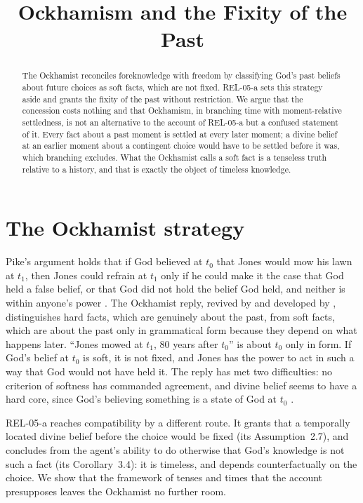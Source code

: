 \documentclass{situationist-preprint}
\title{Ockhamism and the Fixity of the Past}
\begin{document}
\maketitle

\begin{abstract}
The Ockhamist reconciles foreknowledge with freedom by classifying God's past beliefs about future choices as soft facts, which are not fixed. REL-05-a sets this strategy aside and grants the fixity of the past without restriction. We argue that the concession costs nothing and that Ockhamism, in branching time with moment-relative settledness, is not an alternative to the account of REL-05-a but a confused statement of it. Every fact about a past moment is settled at every later moment; a divine belief at an earlier moment about a contingent choice would have to be settled before it was, which branching excludes. What the Ockhamist calls a soft fact is a tenseless truth relative to a history, and that is exactly the object of timeless knowledge.
\end{abstract}

\section{The Ockhamist strategy}

Pike's argument holds that if God believed at $t_0$ that Jones would mow his lawn at $t_1$, then Jones could refrain at $t_1$ only if he could make it the case that God held a false belief, or that God did not hold the belief God held, and neither is within anyone's power \citep{Pike1965}. The Ockhamist reply, revived by \citet{Adams1967} and developed by \citet{Plantinga1986}, distinguishes hard facts, which are genuinely about the past, from soft facts, which are about the past only in grammatical form because they depend on what happens later. \enquote{Jones mowed at $t_1$, 80 years after $t_0$} is about $t_0$ only in form. If God's belief at $t_0$ is soft, it is not fixed, and Jones has the power to act in such a way that God would not have held it. The reply has met two difficulties: no criterion of softness has commanded agreement, and divine belief seems to have a hard core, since God's believing something is a state of God at $t_0$ \citep{Zagzebski1991}.

REL-05-a reaches compatibility by a different route. It grants that a temporally located divine belief before the choice would be fixed (its Assumption~2.7), and concludes from the agent's ability to do otherwise that God's knowledge is not such a fact (its Corollary~3.4): it is timeless, and depends counterfactually on the choice. We show that the framework of tenses and times that the account presupposes leaves the Ockhamist no further room.
\end{document}
